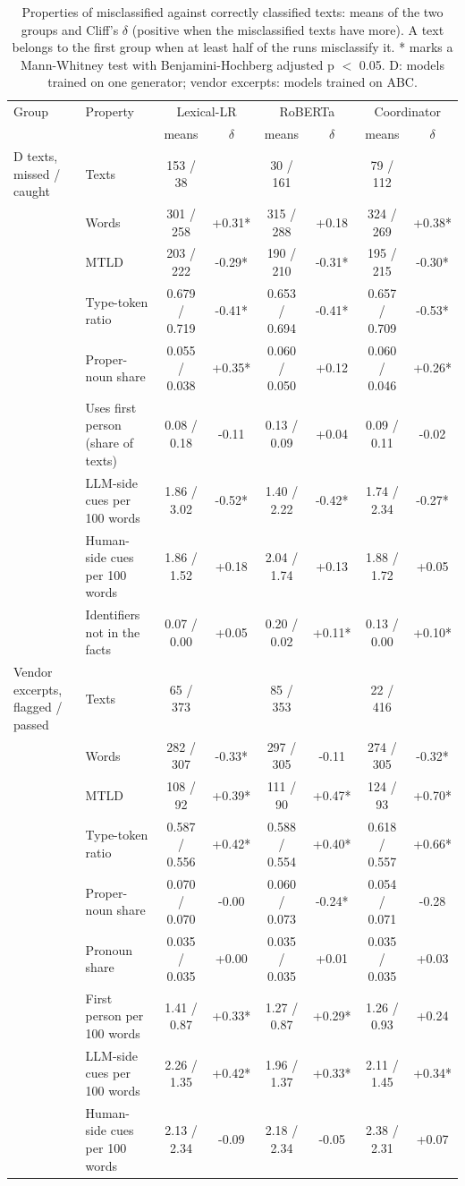 \begin{table}[t]
\centering
\footnotesize
\caption{Properties of misclassified against correctly classified texts: means of the two groups and Cliff's $\delta$ (positive when the misclassified texts have more). A text belongs to the first group when at least half of the runs misclassify it. * marks a Mann-Whitney test with Benjamini-Hochberg adjusted p $<$ 0.05. D: models trained on one generator; vendor excerpts: models trained on ABC.}
\label{tab:contrast}
\begin{tabular}{llcccccc}
\toprule
Group & Property & \multicolumn{2}{c}{Lexical-LR} & \multicolumn{2}{c}{RoBERTa} & \multicolumn{2}{c}{Coordinator} \\
 & & means & $\delta$ & means & $\delta$ & means & $\delta$ \\
\midrule
D texts, missed / caught & Texts & 153 / 38 &  & 30 / 161 &  & 79 / 112 &  \\
 & Words & 301 / 258 & +0.31* & 315 / 288 & +0.18 & 324 / 269 & +0.38* \\
 & MTLD & 203 / 222 & -0.29* & 190 / 210 & -0.31* & 195 / 215 & -0.30* \\
 & Type-token ratio & 0.679 / 0.719 & -0.41* & 0.653 / 0.694 & -0.41* & 0.657 / 0.709 & -0.53* \\
 & Proper-noun share & 0.055 / 0.038 & +0.35* & 0.060 / 0.050 & +0.12 & 0.060 / 0.046 & +0.26* \\
 & Uses first person (share of texts) & 0.08 / 0.18 & -0.11 & 0.13 / 0.09 & +0.04 & 0.09 / 0.11 & -0.02 \\
 & LLM-side cues per 100 words & 1.86 / 3.02 & -0.52* & 1.40 / 2.22 & -0.42* & 1.74 / 2.34 & -0.27* \\
 & Human-side cues per 100 words & 1.86 / 1.52 & +0.18 & 2.04 / 1.74 & +0.13 & 1.88 / 1.72 & +0.05 \\
 & Identifiers not in the facts & 0.07 / 0.00 & +0.05 & 0.20 / 0.02 & +0.11* & 0.13 / 0.00 & +0.10* \\
Vendor excerpts, flagged / passed & Texts & 65 / 373 &  & 85 / 353 &  & 22 / 416 &  \\
 & Words & 282 / 307 & -0.33* & 297 / 305 & -0.11 & 274 / 305 & -0.32* \\
 & MTLD & 108 / 92 & +0.39* & 111 / 90 & +0.47* & 124 / 93 & +0.70* \\
 & Type-token ratio & 0.587 / 0.556 & +0.42* & 0.588 / 0.554 & +0.40* & 0.618 / 0.557 & +0.66* \\
 & Proper-noun share & 0.070 / 0.070 & -0.00 & 0.060 / 0.073 & -0.24* & 0.054 / 0.071 & -0.28 \\
 & Pronoun share & 0.035 / 0.035 & +0.00 & 0.035 / 0.035 & +0.01 & 0.035 / 0.035 & +0.03 \\
 & First person per 100 words & 1.41 / 0.87 & +0.33* & 1.27 / 0.87 & +0.29* & 1.26 / 0.93 & +0.24 \\
 & LLM-side cues per 100 words & 2.26 / 1.35 & +0.42* & 1.96 / 1.37 & +0.33* & 2.11 / 1.45 & +0.34* \\
 & Human-side cues per 100 words & 2.13 / 2.34 & -0.09 & 2.18 / 2.34 & -0.05 & 2.38 / 2.31 & +0.07 \\
\bottomrule
\end{tabular}
\end{table}
